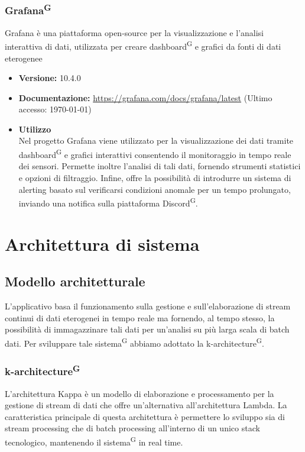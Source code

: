 \documentclass[8pt]{article}
\newcommand{\glossterm}[1]{#1\textsuperscript{G}} %
\begin{document}
\subsubsection{\glossterm{Grafana}}
Grafana è una piattaforma open-source per la visualizzazione e l'analisi interattiva di dati, utilizzata per creare \glossterm{dashboard} e grafici da fonti di dati eterogenee
\begin{itemize}
    \item \textbf{Versione:} 10.4.0
    \item \textbf{Documentazione:} \href{https://grafana.com/docs/grafana/latest}{\color{myblue}https://grafana.com/docs/grafana/latest} (Ultimo accesso: \today)
    \item \textbf{Utilizzo}
    \\Nel progetto Grafana viene utilizzato per la visualizzazione dei dati tramite \glossterm{dashboard} e grafici interattivi consentendo il monitoraggio in tempo reale dei sensori.
    Permette inoltre l'analisi di tali dati, fornendo strumenti statistici e opzioni di filtraggio. Infine, offre la possibilità di introdurre un sistema di alerting basato sul verificarsi condizioni anomale per un tempo prolungato, inviando una notifica sulla piattaforma \glossterm{Discord}.
\end{itemize}
\newpage
\section{Architettura di sistema}\label{sec:arc}
\subsection{Modello architetturale}
L'applicativo basa il funzionamento sulla gestione e sull'elaborazione di stream continui di dati eterogenei in tempo reale ma fornendo, al tempo stesso, la possibilità di immagazzinare tali dati per un'analisi su più larga scala di batch dati. Per sviluppare tale \glossterm{sistema} abbiamo adottato la \glossterm{k-architecture}.
\subsubsection{\glossterm{k-architecture}}
L’architettura Kappa è un modello di elaborazione e processamento per la gestione di stream di dati che offre un’alternativa all’architettura Lambda. La caratteristica principale di questa architettura è permettere lo sviluppo sia di stream processing che di batch processing all’interno di un unico stack tecnologico, mantenendo il \glossterm{sistema} in real time.
\end{document}
